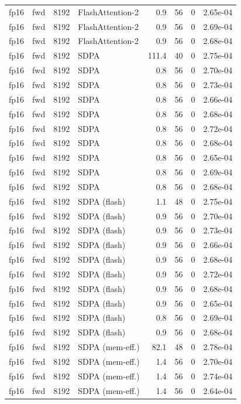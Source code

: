 \begin{tabular}{llrlrrrl}
fp16 & fwd & 8192 & FlashAttention-2 & 0.9 & 56 & 0 & 2.65e-04 \\
fp16 & fwd & 8192 & FlashAttention-2 & 0.9 & 56 & 0 & 2.69e-04 \\
fp16 & fwd & 8192 & FlashAttention-2 & 0.9 & 56 & 0 & 2.68e-04 \\
fp16 & fwd & 8192 & SDPA & 111.4 & 40 & 0 & 2.75e-04 \\
fp16 & fwd & 8192 & SDPA & 0.8 & 56 & 0 & 2.70e-04 \\
fp16 & fwd & 8192 & SDPA & 0.8 & 56 & 0 & 2.73e-04 \\
fp16 & fwd & 8192 & SDPA & 0.8 & 56 & 0 & 2.66e-04 \\
fp16 & fwd & 8192 & SDPA & 0.8 & 56 & 0 & 2.68e-04 \\
fp16 & fwd & 8192 & SDPA & 0.8 & 56 & 0 & 2.72e-04 \\
fp16 & fwd & 8192 & SDPA & 0.8 & 56 & 0 & 2.68e-04 \\
fp16 & fwd & 8192 & SDPA & 0.8 & 56 & 0 & 2.65e-04 \\
fp16 & fwd & 8192 & SDPA & 0.8 & 56 & 0 & 2.69e-04 \\
fp16 & fwd & 8192 & SDPA & 0.8 & 56 & 0 & 2.68e-04 \\
fp16 & fwd & 8192 & SDPA (flash) & 1.1 & 48 & 0 & 2.75e-04 \\
fp16 & fwd & 8192 & SDPA (flash) & 0.9 & 56 & 0 & 2.70e-04 \\
fp16 & fwd & 8192 & SDPA (flash) & 0.9 & 56 & 0 & 2.73e-04 \\
fp16 & fwd & 8192 & SDPA (flash) & 0.9 & 56 & 0 & 2.66e-04 \\
fp16 & fwd & 8192 & SDPA (flash) & 0.9 & 56 & 0 & 2.68e-04 \\
fp16 & fwd & 8192 & SDPA (flash) & 0.9 & 56 & 0 & 2.72e-04 \\
fp16 & fwd & 8192 & SDPA (flash) & 0.9 & 56 & 0 & 2.68e-04 \\
fp16 & fwd & 8192 & SDPA (flash) & 0.9 & 56 & 0 & 2.65e-04 \\
fp16 & fwd & 8192 & SDPA (flash) & 0.8 & 56 & 0 & 2.69e-04 \\
fp16 & fwd & 8192 & SDPA (flash) & 0.9 & 56 & 0 & 2.68e-04 \\
fp16 & fwd & 8192 & SDPA (mem-eff.) & 82.1 & 48 & 0 & 2.78e-04 \\
fp16 & fwd & 8192 & SDPA (mem-eff.) & 1.4 & 56 & 0 & 2.70e-04 \\
fp16 & fwd & 8192 & SDPA (mem-eff.) & 1.4 & 56 & 0 & 2.74e-04 \\
fp16 & fwd & 8192 & SDPA (mem-eff.) & 1.4 & 56 & 0 & 2.64e-04 \\

\end{tabular}
